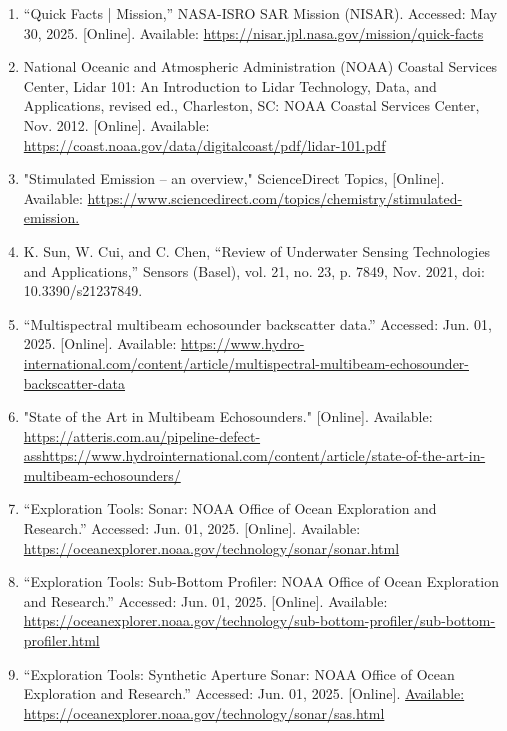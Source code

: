 \documentclass{article}
\begin{document}
\begin{sloppypar}
\begin{enumerate}
    \item{“Quick Facts | Mission,” NASA-ISRO SAR Mission (NISAR). Accessed: May 30, 2025. [Online]. Available: \url{https://nisar.jpl.nasa.gov/mission/quick-facts}}


    \item {National Oceanic and Atmospheric Administration (NOAA) Coastal Services Center, Lidar 101: An Introduction to Lidar Technology, Data, and Applications, revised ed., Charleston, SC: NOAA Coastal Services Center, Nov. 2012. [Online]. Available: \url{https://coast.noaa.gov/data/digitalcoast/pdf/lidar-101.pdf}}

    \item{"Stimulated Emission – an overview," ScienceDirect Topics, [Online]. Available: \url{https://www.sciencedirect.com/topics/chemistry/stimulated-emission.}}


    \item{K. Sun, W. Cui, and C. Chen, “Review of Underwater Sensing Technologies and Applications,” Sensors (Basel), vol. 21, no. 23, p. 7849, Nov. 2021, doi: 10.3390/s21237849.}

    \item{“Multispectral multibeam echosounder backscatter data.” Accessed: Jun. 01, 2025. [Online]. Available: \url{https://www.hydro-international.com/content/article/multispectral-multibeam-echosounder-backscatter-data}}


    \item{"State of the Art in Multibeam Echosounders." [Online]. Available: \url{https://atteris.com.au/pipeline-defect-asshttps://www.hydrointernational.com/content/article/state-of-the-art-in-multibeam-echosounders/}}


    \item{“Exploration Tools: Sonar: NOAA Office of Ocean Exploration and Research.” Accessed: Jun. 01, 2025. [Online]. Available: \url{https://oceanexplorer.noaa.gov/technology/sonar/sonar.html}}


    \item{“Exploration Tools: Sub-Bottom Profiler: NOAA Office of Ocean Exploration and Research.” Accessed: Jun. 01, 2025. [Online]. Available: \url{https://oceanexplorer.noaa.gov/technology/sub-bottom-profiler/sub-bottom-profiler.html}}


    \item{“Exploration Tools: Synthetic Aperture Sonar: NOAA Office of Ocean Exploration and Research.” Accessed: Jun. 01, 2025. [Online]. \url{Available: https://oceanexplorer.noaa.gov/technology/sonar/sas.html}}



\end{enumerate}
\end{sloppypar}
\end{document}
